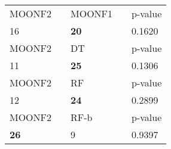 \begin{tabular}{ l l l l l}
\midrule
{MOONF2} & & {MOONF1} & & {p-value}\\
16 & & \textbf{20} & & 0.1620\\
\midrule
{MOONF2} & & {DT} & & {p-value}\\
11 & & \textbf{25} & & 0.1306\\
\midrule
{MOONF2} & & {RF} & & {p-value}\\
12 & & \textbf{24} & & 0.2899\\
\midrule
{MOONF2} & & {RF-b} & & {p-value}\\
\textbf{26} & & 9 & & 0.9397\\
\midrule
\end{tabular}
